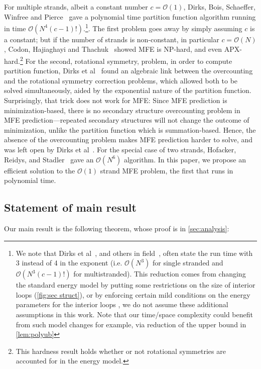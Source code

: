 For multiple strands, albeit a constant number $c = \mathcal{O}(1)$, 
Dirks,  Bois, Schaeffer, Winfree and  
Pierce~\cite{dirks2007thermodynamic} gave a polynomial time partition function algorithm running in time $\mathcal{O}(N^4 (c-1)!)$.\footnote{We note that Dirks et al~\cite{dirks2007thermodynamic}, and others in field~\cite{zukeroptimal,zukerrna,condon2021predicting,waterman1986rapid,mccaskill1990equilibrium,boehmer2024rna}, often state the run time with 3  instead of 4 in the exponent (i.e. $\mathcal{O}(N^3)$ for single stranded and $\mathcal{O}(N^3 (c-1)!)$ for multistranded). This reduction comes from changing the standard energy model by putting some restrictions on the size of interior loops (\cref{fig:sec struct}), or by enforcing certain mild conditions on the energy parameters for the interior loops  \cite{lyngso1999fast,hofacker2012symmetric}, we do not assume these additional assumptions in this work.\label{ft:N3} Note that our time/space complexity could benefit from such model changes for example, via reduction of the upper bound in \cref{lem:polyub}}. 
The first problem goes away by simply assuming $c$ is a constant;
but if the number of strands is non-constant, in particular $c = \mathcal{O}(N)$, 
Codon, Hajiaghayi and Thachuk~\cite{condon2021predicting} showed MFE is NP-hard, and even APX-hard.\footnote{This hardness result holds whether or not rotational symmetries are accounted for in the energy model.} 
For the second, rotational symmetry, problem, in order to compute partition function, Dirks et al~\cite{dirks2007thermodynamic} found an algebraic link between the overcounting and the rotational symmetry correction problems, which allowed both to be solved simultaneously, aided by the exponential nature of the partition function.  
Surprisingly, that trick does not work for MFE:
Since MFE prediction is minimization-based, 
there is no secondary structure overcounting problem in MFE prediction---repeated secondary structures will not change the outcome of minimization, unlike the partition function which is summation-based.
Hence, the absence of the overcounting problem makes MFE prediction harder to solve, and was left open by Dirks et al~\cite{dirks2007thermodynamic}.
For the special case of two strands, Hofacker, Reidys, and Stadler~\cite{hofacker2012symmetric} gave an $\mathcal{O}(N^6)$  algorithm. In this paper, we propose an efficient solution to the $\mathcal{O}(1)$ strand MFE problem, the first that runs in polynomial time. 



\subsection{Statement of main result}
Our main result is the following theorem, whose proof is in \cref{sec:analysis}: 

